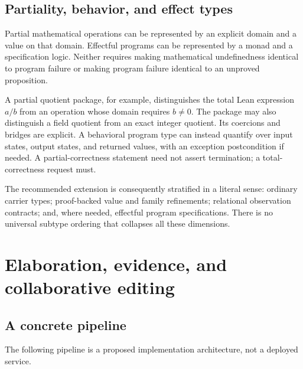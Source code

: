 \documentclass[11pt,a4paper]{article}
\theoremstyle{plain}\newtheorem{proposition}{Proposition}[section]
\theoremstyle{definition}\newtheorem{definition}[proposition]{Definition}
\theoremstyle{remark}\newtheorem{remark}[proposition]{Remark}
\begin{document}
\subsection{Partiality, behavior, and effect types}
Partial mathematical operations can be represented by an explicit domain and a value on that domain. Effectful programs can be represented by a monad and a specification logic. Neither requires making mathematical undefinedness identical to program failure or making program failure identical to an unproved proposition.

A partial quotient package, for example, distinguishes the total Lean expression \(a/b\) from an operation whose domain requires \(b\ne0\). The package may also distinguish a field quotient from an exact integer quotient. Its coercions and bridges are explicit. A behavioral program type can instead quantify over input states, output states, and returned values, with an exception postcondition if needed. A partial-correctness statement need not assert termination; a total-correctness request must.

The recommended extension is consequently stratified in a literal sense: ordinary carrier types; proof-backed value and family refinements; relational observation contracts; and, where needed, effectful program specifications. There is no universal subtype ordering that collapses all these dimensions.

\section{Elaboration, evidence, and collaborative editing}\label{sec:implementation}
\subsection{A concrete pipeline}
The following pipeline is a proposed implementation architecture, not a deployed service.
\begin{center}
\end{center}
\end{document}
